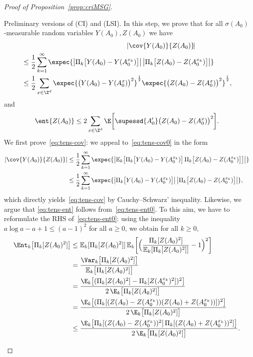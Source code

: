 \begin{proof}[Proof of Proposition~\ref{prop:criMSG}]
\begin{step}{Preliminary versions of (CI) and (LSI).}\label{step2proofprop2.3}
In this step, we prove that for all $\sigma(A_0)$-measurable random variables $Y(A_0),Z(A_0)$ we have
\begin{multline}\label{eq:tens-cov}
\lefteqn{|\cov{Y(A_0)}{Z(A_0)}\!|}
\\
\begin{aligned}
&\le\frac12\sum_{k=1}^\infty\expec{\big|\Pi_{k}\big[Y(A_0)-Y(A_0^{x_k})\big]\big|\,\big|\Pi_{k}\big[Z(A_0)-Z(A_0^{x_k})\big]\big|}
\\
&\le\frac12\sum_{x\in\Z^d}\expec{\big(Y(A_0)-Y(A_0^{x})\big)^2}^\frac12\expec{\big(Z(A_0)-Z(A_0^{x})\big)^2}^\frac12,
\end{aligned}
\end{multline}
and
\begin{equation}\label{eq:tens-ent}
\ent{Z(A_0)}\le2\sum_{x\in\Z^d}\E\bigg[{\supessd{A_0'}\big(Z(A_0)-Z(A_0^{x})\big)^2}\bigg].
\end{equation}
We first prove~\eqref{eq:tens-cov}: we appeal to~\eqref{eq:tens-cov0} in the form
\begin{align*}
|\cov{Y(A_0)}{Z(A_0)}|&\le\frac12\sum_{k=1}^\infty\expec{\big|\mathbb E_k\big[\Pi_{k}\big[Y(A_0)-Y(A_0^{x_k})\big]\,\Pi_{k}\big[Z(A_0)-Z(A_0^{x_k})\big]\big]\big|}\\
&\le\frac12\sum_{k=1}^\infty\expec{\big|\Pi_{k}\big[Y(A_0)-Y(A_0^{x_k})\big]\big|\,\big|\Pi_{k}\big[Z(A_0)-Z(A_0^{x_k})\big]\big|},
\end{align*}
which directly yields~\eqref{eq:tens-cov} by Cauchy--Schwarz' inequality. Likewise, we argue that \eqref{eq:tens-ent} follows from~\eqref{eq:tens-ent0}. To this aim, we have to reformulate the RHS of~\eqref{eq:tens-ent0}: using the inequality $a\log a-a+1\le(a-1)^2$ for all $a\ge0$, we obtain for all $k\ge 0$,
\begin{align*}
\Ent_{k}\big[\Pi_k[Z(A_0)^2]\big]&\le\mathbb E_k[\Pi_k[Z(A_0)^2]]\,\mathbb E_k\bigg[\Big(\frac{\Pi_k[Z(A_0)^2]}{\mathbb E_k[\Pi_k[Z(A_0)^2]]}-1\Big)^2\bigg]\\
&=\frac{\Var_k\big[\Pi_k[Z(A_0)^2]\big]}{\mathbb E_k\big[\Pi_k[Z(A_0)^2]\big]}\\
&=\frac{\E_k\big[(\Pi_k[Z(A_0)^2]-\Pi_k[Z(A_0^{x_k})^2])^2\big]}{2\,\E_k\big[\Pi_k[Z(A_0)^2]\big]}\\
&=\frac{\E_k\big[(\Pi_k[(Z(A_0)-Z(A_0^{x_k}))(Z(A_0)+Z(A_0^{x_k}))])^2\big]}{2\,\E_k\big[\Pi_k[Z(A_0)^2]\big]}\\
&\le\frac{\E_k\big[\Pi_k[(Z(A_0)-Z(A_0^{x_k}))^2]\,\Pi_k[(Z(A_0)+Z(A_0^{x_k}))^2]\big]}{2\,\E_k\big[\Pi_k[Z(A_0)^2]\big]}.

\end{align*}
\end{step}
\end{proof}
